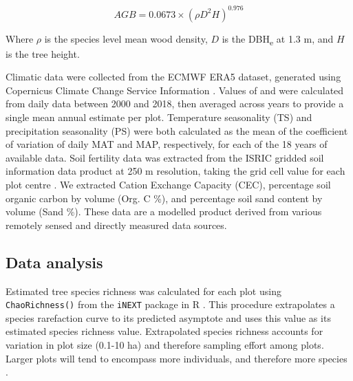 \documentclass[11pt,a4paper]{article}
\newcommand{\todo}[1]{\textcolor{red}{\textbf{#1}}}   %
\begin{document}
\begin{equation}
	AGB = 0.0673 \times (\rho D^{2} H)^{0.976}
	\label{chave_agb}
\end{equation}

Where $\rho$ is the species level mean wood density, $D$ is the DBH\textsubscript{e} at 1.3 m, and $H$ is the tree height.

Climatic data were collected from the ECMWF ERA5 dataset, generated using Copernicus Climate Change Service Information \citep{ERA5}. Values of  and  were calculated from daily data between 2000 and 2018, then averaged across years to provide a single mean annual estimate per plot. Temperature seasonality (TS) and precipitation seasonality (PS) were both calculated as the mean of the coefficient of variation of daily MAT and MAP, respectively, for each of the 18 years of available data. Soil fertility data was extracted from the ISRIC gridded soil information data product at 250 m resolution, taking the grid cell value for each plot centre \citep{Hengl2017}. We extracted Cation Exchange Capacity (CEC), percentage soil organic carbon by volume (Org. C \%), and percentage soil sand content by volume (Sand \%). These data are a modelled product derived from various remotely sensed and directly measured data sources. 

% 
% 

\subsection*{Data analysis}
Estimated tree species richness was calculated for each plot using \verb|ChaoRichness()| from the \verb|iNEXT| package in R \citep{Hsieh2016}. This procedure extrapolates a species rarefaction curve to its predicted asymptote and uses this value as its estimated species richness value. Extrapolated species richness accounts for variation in plot size (0.1-10 ha) and therefore sampling effort among plots. Larger plots will tend to encompass more individuals, and therefore more species \citep{Dengler2009}.
\end{document}
